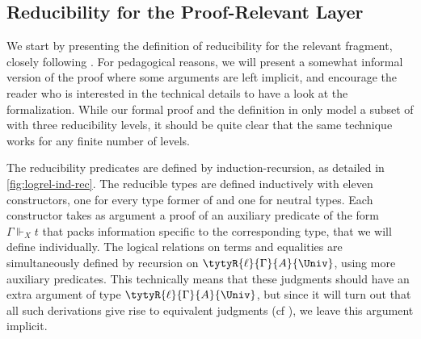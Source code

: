 \subsection{Reducibility for the Proof-Relevant Layer}

We start by presenting the definition of reducibility for the relevant
fragment, closely following .
%
For pedagogical reasons, we will present a somewhat informal version
of the proof where some arguments are left implicit, and encourage the reader 
who is interested in the technical details to have a look at the \Agda 
formalization.
%
While our formal proof and the definition in  only 
model a subset of \SetoidCC with three reducibility levels, it should be quite 
clear that the same technique works for any finite number of levels.

The reducibility predicates are defined by induction-recursion, as detailed
in \cref{fig:logrel-ind-rec}.
%
The reducible types are defined inductively with eleven constructors, one for 
every type former of \SetoidCC and one for neutral types. 
% 
Each constructor takes as argument a proof of an auxiliary predicate of the 
form \( \Gamma \Vdash_X t \) that packs information specific to the 
corresponding type, that we will define individually.
%
The logical relations on terms and equalities are simultaneously
defined by recursion on \( \tytyR{\ell}{\Gamma}{A}{\Univ} \), using
more auxiliary predicates.
%
This technically means that these judgments should have an extra
argument of type \( \tytyR{\ell}{\Gamma}{A}{\Univ} \), but since it
will turn out that all such derivations give rise to equivalent judgments
(cf ), we leave this argument implicit.

